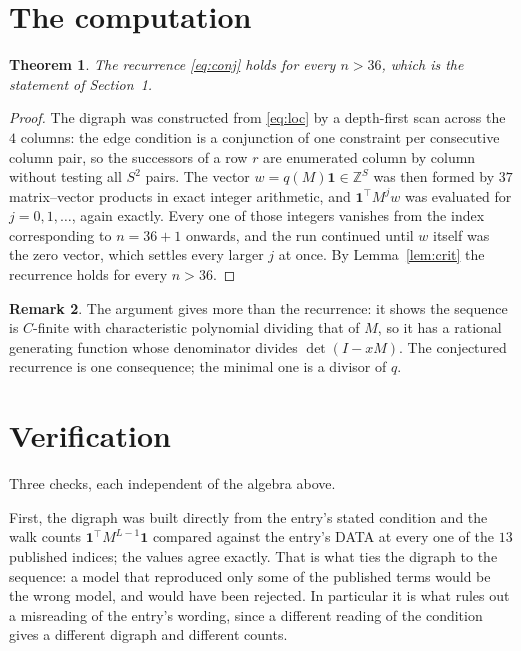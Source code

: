 \documentclass[11pt,a4paper]{article}
\theoremstyle{plain}
\newtheorem{theorem}{Theorem}
\theoremstyle{definition}
\newtheorem{remark}[theorem]{Remark}
\begin{document}
\section{The computation}

\begin{theorem}
The recurrence \eqref{eq:conj} holds for every $n>36$, which is the statement of
Section~1.
\end{theorem}

\begin{proof}
The digraph was constructed from \eqref{eq:loc} by a depth-first scan across the $4$
columns: the edge condition is a conjunction of one constraint per consecutive column
pair, so the successors of a row $r$ are enumerated column by column without testing all
$S^2$ pairs. The vector $w=q(M)\mathbf{1}\in\mathbb{Z}^{S}$ was then formed by $37$
matrix--vector products in exact integer arithmetic, and $\mathbf{1}^{\!\top}M^{j}w$ was
evaluated for $j=0,1,\dots$, again exactly. Every one of those integers vanishes from the
index corresponding to $n=36+1$ onwards, and the run continued until $w$ itself was the
zero vector, which settles every larger $j$ at once. By Lemma~\ref{lem:crit} the recurrence
holds for every $n>36$.
\end{proof}

\begin{remark}
The argument gives more than the recurrence: it shows the sequence is $C$-finite with
characteristic polynomial dividing that of $M$, so it has a rational generating function
whose denominator divides $\det(I-xM)$. The conjectured recurrence is one consequence; the
minimal one is a divisor of $q$.
\end{remark}

\section{Verification}

Three checks, each independent of the algebra above.

First, the digraph was built directly from the entry's stated condition and the walk counts
$\mathbf{1}^{\!\top}M^{L-1}\mathbf{1}$ compared against the entry's DATA at
every one of the $13$ published indices; the values agree exactly. That is what ties
the digraph to the sequence: a model that reproduced only some of the published terms would
be the wrong model, and would have been rejected. In particular it is what rules out a
misreading of the entry's wording, since a different reading of the condition gives a
different digraph and different counts.
\end{document}
